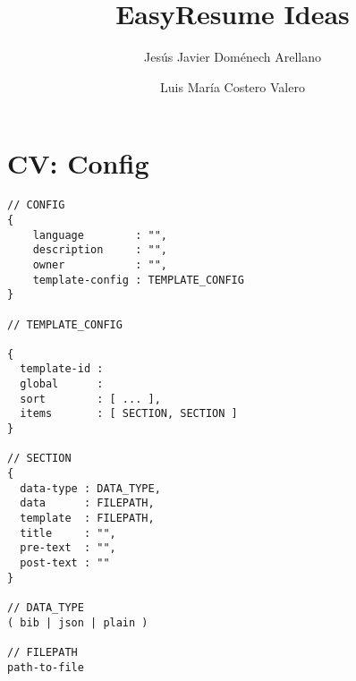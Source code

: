 \documentclass{article}
\begin{document}
\title{EasyResume Ideas}

\author{Jes\'us Javier Dom\'enech Arellano \and Luis Mar\'ia Costero Valero}

\maketitle 


\section{CV: Config}


\begin{lstlisting}
// CONFIG 
{
    language        : "",
    description     : "",
    owner           : "",
    template-config : TEMPLATE_CONFIG
}

// TEMPLATE_CONFIG

{
  template-id : 
  global      :
  sort        : [ ... ],
  items       : [ SECTION, SECTION ]
}

// SECTION
{
  data-type : DATA_TYPE,
  data      : FILEPATH,
  template  : FILEPATH,
  title     : "",
  pre-text  : "", 
  post-text : ""
}

// DATA_TYPE
( bib | json | plain )

// FILEPATH
path-to-file



\end{lstlisting}
\end{document}
